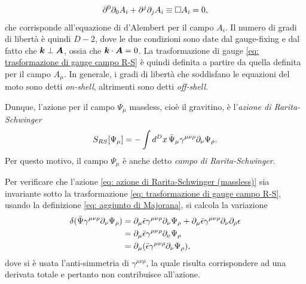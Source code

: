 \begin{equation}
    \partial^0\partial_0 A_i + \partial^j\partial_j A_i \equiv \square A_i = 0,
\end{equation}
che corrisponde all'equazione di d'Alembert per il campo $A_i$. Il numero di gradi di libertà è quindi $D - 2$, dove le due condizioni sono date dal gauge-fixing e dal fatto che $\bm{k} \perp \bm{A}$, ossia che $\bm{k} \cdot \bm{A} = 0$. La trasformazione di gauge \eqref{eq: trasformazione di gauge campo R-S} è quindi definita a partire da quella definita per il campo $A_\mu$. In generale, i gradi di libertà che soddisfano le equazioni del moto sono detti \emph{on-shell}, altrimenti sono detti \emph{off-shell}.

Dunque, l'azione per il campo $\Psi_\mu$ massless, cioè il gravitino, è l'\emph{azione di Rarita-Schwinger} 
\begin{equation}
\label{eq: azione di Rarita-Schwinger (massless)}
    S_{RS}[\Psi_\mu] = -\int d^Dx\,\bar{\Psi}_\mu\gamma^{\mu\nu\rho}\partial_\nu\Psi_\rho.
\end{equation}
Per questo motivo, il campo $\Psi_\mu$ è anche detto \emph{campo di Rarita-Schwinger}.

Per verificare che l'azione \eqref{eq: azione di Rarita-Schwinger (massless)} sia invariante sotto la trasformazione \eqref{eq: trasformazione di gauge campo R-S}, usando la definizione \eqref{eq: aggiunto di Majorana}, si calcola la variazione
\begin{equation}
    \begin{split}
        \delta(\bar{\Psi}\gamma^{\mu\nu\rho}\partial_\nu\Psi_\rho) &= \partial_\mu\bar{\epsilon}\gamma^{\mu\nu\rho}\partial_\nu\Psi_\rho + \partial_\mu\bar{\epsilon}\gamma^{\mu\nu\rho}\partial_\nu\partial_\rho\epsilon \\
        &= \partial_\mu\bar{\epsilon}\gamma^{\mu\nu\rho}\partial_\nu\Psi_\rho \\
        &= \partial_\mu(\bar{\epsilon}\gamma^{\mu\nu\rho}\partial_\nu\Psi_\rho),
    \end{split}
\end{equation}
dove si è usata l'anti-simmetria di $\gamma^{\mu\nu\rho}$, la quale risulta corrispondere ad una derivata totale e pertanto non contribuisce all'azione. 

